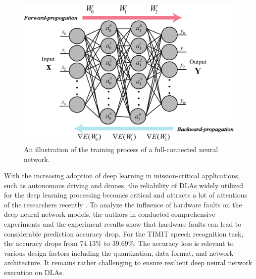 \begin{figure}
    \centering
    \includegraphics[width=1\linewidth]{images/OL-fig2}
    \caption{An illustration of the training process of a full-connected neural network.}
    \label{fig:networktraining}
    \vspace{-15pt}
\end{figure}

With the increasing adoption of deep learning in mission-critical applications, such as autonomous driving and drones, the reliability of DLAs widely utilized for the deep learning processing becomes critical and attracts a lot of attentions of the researchers recently \cite{mittal2020survey} \cite{xu2021reliability} \cite{xu2020persistent} \cite{ning2020ftt}. To analyze the influence of hardware faults on the deep neural network models, the authors in \cite{zhang2019fault} conducted comprehensive experiments and the experiment results show that hardware faults can lead to considerable prediction accuracy drop. For the TIMIT speech recognition task, the accuracy drops from 74.13$\%$ to 39.69$\%$. The accuracy loss is relevant to various design factors including the quantization, data format, and network architecture. It remains rather challenging to ensure resilient deep neural network execution on DLAs.

